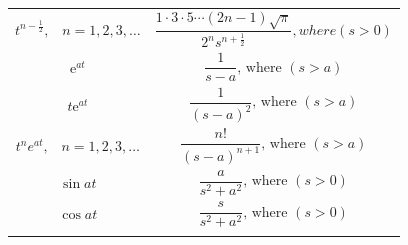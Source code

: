 \documentclass[
]{book}
\begin{document}
\begin{longtable}[]{@{}ll@{}}
\begin{minipage}[t]{0.42\columnwidth}\raggedright
\[{t^{n - \frac{1}{2}}},\,\,\,\,\,n = 1,2,3, \ldots\]\strut
\end{minipage} & \begin{minipage}[t]{0.52\columnwidth}\raggedright
\[\frac{{1 \cdot 3 \cdot 5 \cdots \left( {2n - 1} \right)\sqrt \pi  }}{{{2^n}{s^{n + \frac{1}{2}}}}} {, where } \left(s >  0\right) \]\strut
\end{minipage}\tabularnewline
\begin{minipage}[t]{0.42\columnwidth}\raggedright
\[\mathrm{e}^{at}\]\strut
\end{minipage} & \begin{minipage}[t]{0.52\columnwidth}\raggedright
\[ \frac{1}{s-a} \text{, where } \left(s >  a \right) \]\strut
\end{minipage}\tabularnewline
\begin{minipage}[t]{0.42\columnwidth}\raggedright
\[t\mathrm{e}^{at}\]\strut
\end{minipage} & \begin{minipage}[t]{0.52\columnwidth}\raggedright
\[\frac{1}{{\left( {s - a} \right)}^{2}} \text{, where } \left(s >  a \right) \]\strut
\end{minipage}\tabularnewline
\begin{minipage}[t]{0.42\columnwidth}\raggedright
\[{t^n}{{e}^{at}},\,\,\,\,\,n = 1,2,3, \ldots\]\strut
\end{minipage} & \begin{minipage}[t]{0.52\columnwidth}\raggedright
\[\frac{{n!}}{{{{\left( {s - a} \right)}^{n + 1}}}} \text{, where } \left(s >  a \right) \]\strut
\end{minipage}\tabularnewline
\begin{minipage}[t]{0.42\columnwidth}\raggedright
\[\sin{at} \]\strut
\end{minipage} & \begin{minipage}[t]{0.52\columnwidth}\raggedright
\[\frac{a}{s^2 + a^2} \text{, where } \left(s >  0 \right) \]\strut
\end{minipage}\tabularnewline
\begin{minipage}[t]{0.42\columnwidth}\raggedright
\[\cos{at}\]\strut
\end{minipage} & \begin{minipage}[t]{0.52\columnwidth}\raggedright
\[\frac{s}{s^2 + a^2} \text{, where } \left(s >  0 \right) \]\strut
\end{minipage}\tabularnewline
\begin{minipage}[t]{0.42\columnwidth}\raggedright

\end{minipage}
\end{longtable}
\end{document}
